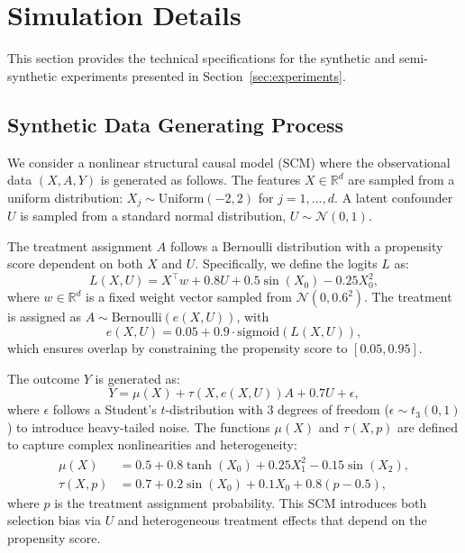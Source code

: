 \section{Simulation Details}
\label{app:simulations}

This section provides the technical specifications for the synthetic and semi-synthetic experiments presented in Section~\ref{sec:experiments}.

\subsection{Synthetic Data Generating Process}
\label{app:sim:synthetic}

We consider a nonlinear structural causal model (SCM) where the observational data $(X, A, Y)$ is generated as follows. The features $X \in \mathbb{R}^d$ are sampled from a uniform distribution: $X_j \sim \text{Uniform}(-2, 2)$ for $j=1, \dots, d$. A latent confounder $U$ is sampled from a standard normal distribution, $U \sim \mathcal{N}(0, 1)$.

The treatment assignment $A$ follows a Bernoulli distribution with a propensity score dependent on both $X$ and $U$. Specifically, we define the logits $L$ as:
\begin{equation}
    L(X, U) = X^\top w + 0.8 U + 0.5 \sin(X_0) - 0.25 X_0^2,
\end{equation}
where $w \in \mathbb{R}^d$ is a fixed weight vector sampled from $\mathcal{N}(0, 0.6^2)$. The treatment is assigned as $A \sim \text{Bernoulli}(e(X, U))$, with
\begin{equation}
    e(X, U) = 0.05 + 0.9 \cdot \text{sigmoid}(L(X, U)),
\end{equation}
which ensures overlap by constraining the propensity score to $[0.05, 0.95]$.

The outcome $Y$ is generated as:
\begin{equation}
    Y = \mu(X) + \tau(X, e(X, U)) A + 0.7 U + \epsilon,
\end{equation}
where $\epsilon$ follows a Student's $t$-distribution with 3 degrees of freedom ($\epsilon \sim t_3(0, 1)$) to introduce heavy-tailed noise. The functions $\mu(X)$ and $\tau(X, p)$ are defined to capture complex nonlinearities and heterogeneity:
\begin{align}
    \mu(X) &= 0.5 + 0.8 \tanh(X_0) + 0.25 X_1^2 - 0.15 \sin(X_2), \\
    \tau(X, p) &= 0.7 + 0.2 \sin(X_0) + 0.1 X_0 + 0.8(p - 0.5),
\end{align}
where $p$ is the treatment assignment probability. This SCM introduces both selection bias via $U$ and heterogeneous treatment effects that depend on the propensity score.

